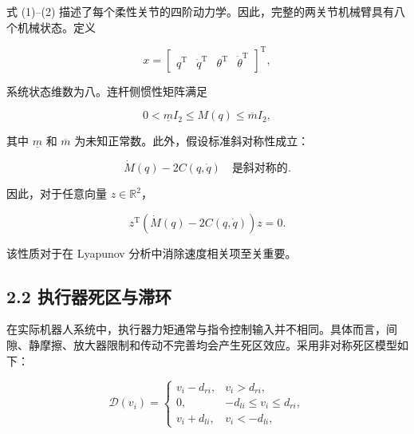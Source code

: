 \documentclass{article}
\begin{document}
式 (1)--(2) 描述了每个柔性关节的四阶动力学。因此，完整的两关节机械臂具有八个机械状态。定义

\begin{equation*}
x=\begin{bmatrix}q^{\mathrm T} & \dot q^{\mathrm T} & \theta^{\mathrm T} & \dot\theta^{\mathrm T}\end{bmatrix}^{\mathrm T},
\end{equation*}

系统状态维数为八。连杆侧惯性矩阵满足

\begin{equation}
0<\underline m I_2\leq M(q)\leq \overline m I_2, \tag{4}
\end{equation}

其中 $\underline m$ 和 $\overline m$ 为未知正常数。此外，假设标准斜对称性成立：

\begin{equation}
\dot M(q)-2C(q,\dot q) \quad \text{是斜对称的}. \tag{5}
\end{equation}

因此，对于任意向量 $z\in\mathbb{R}^{2}$，

\begin{equation*}
z^{\mathrm T}\left(\dot M(q)-2C(q,\dot q)\right)z=0.
\end{equation*}

该性质对于在 Lyapunov 分析中消除速度相关项至关重要。

\begin{figure}[h]
\centering
{}
\end{figure}

\subsection{2.2 执行器死区与滞环}

在实际机器人系统中，执行器力矩通常与指令控制输入并不相同。具体而言，间隙、静摩擦、放大器限制和传动不完善均会产生死区效应。采用非对称死区模型如下：

\begin{equation}
\mathcal{D}(v_i)=\begin{cases}v_i-d_{ri}, & v_i>d_{ri},\\[2mm]0, & -d_{li}\leq v_i\leq d_{ri},\\[2mm]v_i+d_{li}, & v_i<-d_{li},\end{cases} \tag{6}
\end{equation}
\end{document}
